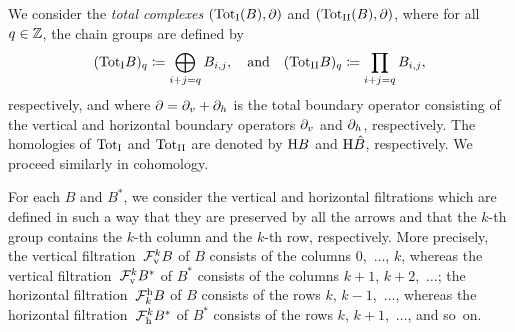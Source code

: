 \documentclass[\MainFolder/Text.tex]{subfiles}
\begin{document}
We consider the \emph{total complexes} $({\mathrm{Tot}_{\mathrm{I}}}(B), \partial)$ and $({\mathrm{Tot}_{\mathrm{II}}}(B),\partial)$, where for all $q\in \mathbb{Z}$, the chain groups are defined by
$$ ({\mathrm{Tot}_{\mathrm{I}}} B)_q \coloneqq \bigoplus_{i + j =q} B_{i,j},\quad\text{and}\quad ({\mathrm{Tot}_{\mathrm{II}}} B)_q \coloneqq \prod_{i + j =q} B_{i,j}, $$
respectively, and where $\partial = \partial_v + \partial_h$ is the total boundary operator consisting of the vertical and horizontal boundary operators $\partial_v$ and $\partial_h$, respectively. 
The homologies of ${\mathrm{Tot}_{\mathrm{I}}}$ and ${\mathrm{Tot}_{\mathrm{II}}}$ are denoted by $\mathrm{H} B$ and $\mathrm{H} \hat{B}$, respectively. We proceed similarly in cohomology.

For each $B$ and $B^*$, we consider the vertical and horizontal filtrations which are defined in such a way that they are preserved by all the arrows and that the $k$-th group contains the $k$-th column and the $k$-th row, respectively. More precisely, the vertical filtration~$\mathcal{F}_{{\mathrm{v}}}^k B$ of $B$ consists of the columns $0$,~$\dotsc$, $k$, whereas the vertical filtration~$\mathcal{F}_{{\mathrm{v}}}^k B^*$ of $B^*$ consists of the columns $k+1$, $k+2$,~$\dotsc$; the horizontal filtration~$\mathcal{F}^{\mathrm{h}}_k B$ of $B$ consists of the rows $k$, $k-1$,~$\dotsc$, whereas the horizontal filtration~$\mathcal{F}_{\mathrm{h}}^k B^*$ of $B^*$ consists of the rows $k$, $k+1$,~$\dotsc$, and so~on.
%
% 
\end{document}
